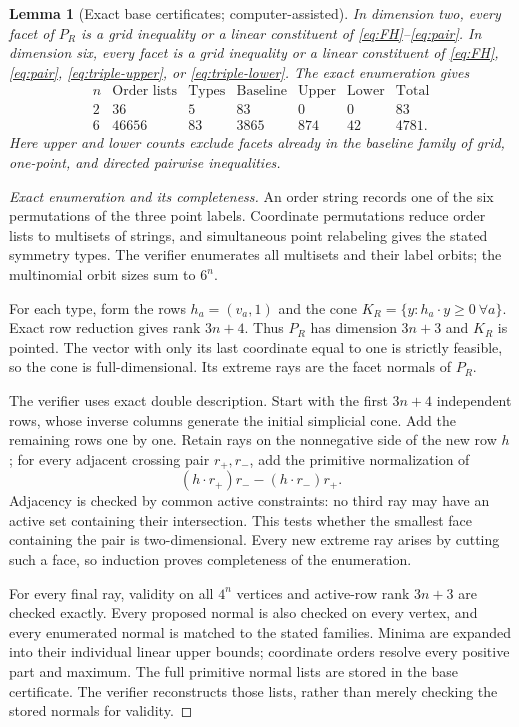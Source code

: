 \documentclass[a4paper,11pt]{amsart}
\numberwithin{equation}{section}
\newtheorem{lemma}[lemma]{Lemma}
\theoremstyle{definition}
\theoremstyle{remark}
\begin{document}
\begin{lemma}[Exact base certificates; computer-assisted]\label{lem:finite-bases}
In dimension two, every facet of $P_R$ is a grid inequality or a
linear constituent of \eqref{eq:FH}--\eqref{eq:pair}.
In dimension six, every facet is a grid inequality or a linear
constituent of \eqref{eq:FH}, \eqref{eq:pair}, \eqref{eq:triple-upper}, or \eqref{eq:triple-lower}.
The exact enumeration gives
\[
\begin{array}{c|rrrrrr}
 n&\text{Order lists}&\text{Types}&\text{Baseline}&\text{Upper}
   &\text{Lower}&\text{Total}\\ \hline
 2&36&5&83&0&0&83\\
 6&46656&83&3865&874&42&4781.
\end{array}
\]
Here upper and lower counts exclude facets already in the baseline
family of grid, one-point, and directed pairwise inequalities.
\end{lemma}

\begin{proof}[Exact enumeration and its completeness]
An order string records one of the six permutations of the three point
labels. Coordinate permutations reduce order lists to multisets of
strings, and simultaneous point relabeling gives the stated symmetry
types. The verifier enumerates all multisets and their label orbits;
the multinomial orbit sizes sum to $6^n$.

For each type, form the rows $h_a=(v_a,1)$ and the cone
$K_R=\{y:h_a\cdot y\ge0\ \forall a\}$. Exact row reduction gives rank
$3n+4$. Thus $P_R$ has dimension $3n+3$ and $K_R$ is pointed. The vector
with only its last coordinate equal to one is strictly feasible, so
the cone is full-dimensional. Its extreme rays are the facet normals
of $P_R$.

The verifier uses exact double description. Start with the first
$3n+4$ independent rows, whose inverse columns generate the initial
simplicial cone. Add the remaining rows one by one. Retain rays on the
nonnegative side of the new row $h$; for every adjacent crossing pair
$r_+,r_-$, add the primitive normalization of
\[
 (h\cdot r_+)r_--(h\cdot r_-)r_+.
\]
Adjacency is checked by common active constraints: no third ray may
have an active set containing their intersection. This tests whether
the smallest face containing the pair is two-dimensional. Every new
extreme ray arises by cutting such a face, so induction proves
completeness of the enumeration.

For every final ray, validity on all $4^n$ vertices and active-row rank
$3n+3$ are checked exactly. Every proposed normal is also checked on
every vertex, and every enumerated normal is matched to the stated
families. Minima are expanded into their individual linear upper
bounds; coordinate orders resolve every positive part and maximum.
The full primitive normal lists are stored in the base certificate.
The verifier reconstructs those lists, rather than merely checking
the stored normals for validity.
\end{proof}
\end{document}
